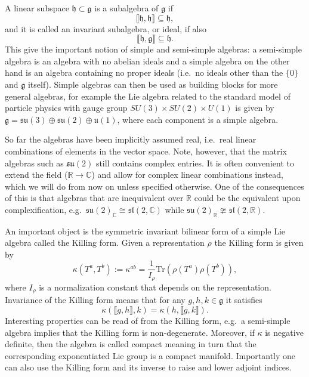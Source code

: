 A linear subspace $\mathfrak{h}\subset \mathfrak{g}$ is a subalgebra of $\mathfrak{g}$ if \begin{equation}
    \llbracket\mathfrak{h},\mathfrak{h}\rrbracket\subseteq \mathfrak{h},
\end{equation} 
and it is called an invariant subalgebra, or ideal, if also
\begin{equation}
    \llbracket\mathfrak{h},\mathfrak{g}\rrbracket\subseteq \mathfrak{h}.
\end{equation}
This give the important notion of simple and semi-simple algebras: a semi-simple algebra is an algebra with no abelian ideals and a simple algebra on the other hand is an algebra containing no proper ideals (i.e.\ no ideals other than the $\{0\}$ and $\mathfrak{g}$ itself). Simple algebras can then be used as building blocks for more general algebras, for example the Lie algebra related to the standard model of particle physics with gauge group $SU(3)\times SU(2)\times U(1)$ is given by $\mathfrak{g}=\mathfrak{su}(3)\oplus\mathfrak{su}(2)\oplus\mathfrak{u}(1)$, where each component is a simple algebra. 

So far the algebras have been implicitly assumed real, i.e.\ real linear combinations of elements in the vector space. Note, however, that the matrix algebras such as $\mathfrak{su}(2)$ still contains complex entries. It is often convenient to extend the field ($\mathbb{R}\to\mathbb{C}$) and allow for complex linear combinations instead, which we will do from now on unless specified otherwise. One of the consequences of this is that algebras that are inequivalent over $\mathbb{R}$ could be the equivalent upon complexification, e.g.\ $\mathfrak{su}(2)_\mathbb{C}\cong \mathfrak{sl}(2,\mathbb{C})$ while $\mathfrak{su}(2)_\mathbb{R}\ncong\mathfrak{sl}(2,\mathbb{\mathbb{R}})$. 

An important object is the symmetric invariant bilinear form of a simple Lie algebra called the Killing form. Given a representation $\rho$ the Killing form is given by 
\begin{equation}
    \kappa(T^a,T^b) := \kappa^{ab} = \frac{1}{I_\rho}\text{Tr}\left(\rho(T^a)\rho(T^b)\right),
\end{equation}
where $I_\rho$ is a normalization constant that depends on the representation. Invariance of the Killing form means that for any $g,h,k\in\mathfrak{g}$ it satisfies 
\begin{equation}
    \kappa(\llbracket g,h\rrbracket,k) = \kappa(h,\llbracket g,k\rrbracket). 
\end{equation}
Interesting properties can be read of from the Killing form, e.g.\ a semi-simple algebra implies that the Killing form is non-degenerate. Moreover, if $\kappa$ is negative definite, then the algebra is called compact meaning in turn that the corresponding exponentiated Lie group is a compact manifold. Importantly one can also use the Killing form and its inverse to raise and lower adjoint indices. 


